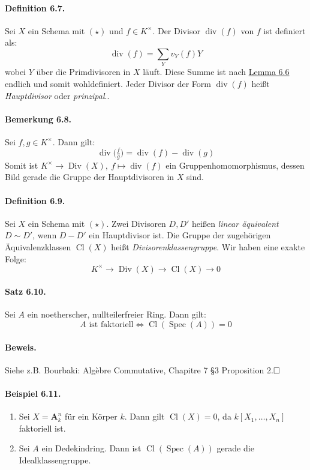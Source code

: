\documentclass[11pt,b5paper,openany]{memoir}
\def \qed {$\hfill\square$}
\begin{document}
\paragraph{Definition 6.7.}\label{6.7} Sei $X$ ein Schema mit $(\star)$ und $f\in K^\times$. Der Divisor $\operatorname{div}(f)$ von $f$ ist definiert als:
\[\operatorname{div}(f)=\sum_Y v_Y(f)Y \]
wobei $Y$ über die Primdivisoren in $X$ läuft. Diese Summe ist nach \hyperref[6.6]{Lemma 6.6} endlich und somit wohldefiniert. Jeder Divisor der Form $\operatorname{div}(f)$ heißt \textit{Hauptdivisor} oder \textit{prinzipal}..

\paragraph{Bemerkung 6.8.}\label{6.8} Sei $f,g\in K^\times$. Dann gilt:
\[\operatorname{div}\big(\tfrac{f}{g}\big)=\operatorname{div}(f)-\operatorname{div}(g) \]
Somit ist $K^\times\to\operatorname{Div}(X),\ f\mapsto\operatorname{div}(f)$ ein Gruppenhomomorphismus, dessen Bild gerade die Gruppe der Hauptdivisoren in $X$ sind.

\paragraph{Definition 6.9.}\label{6.9} Sei $X$ ein Schema mit $(\star)$. Zwei Divisoren $D,D'$ heißen \textit{linear äquivalent} $D\sim D'$, wenn $D-D'$ ein Hauptdivisor ist. Die Gruppe der zugehörigen Äquivalenzklassen $\operatorname{Cl}(X)$ heißt \textit{Divisorenklassengruppe}. Wir haben eine exakte Folge:
\[K^\times\to\operatorname{Div}(X)\to\operatorname{Cl}(X)\to 0 \]

\paragraph{Satz 6.10.}\label{6.10} Sei $A$ ein noetherscher, nullteilerfreier Ring. Dann gilt:
\[A\text{ ist faktoriell}\iff\operatorname{Cl}(\operatorname{Spec}(A))=0 \]

\paragraph{Beweis.} Siehe z.B. Bourbaki: Algèbre Commutative, Chapitre 7 §3 Proposition 2.\qed

\paragraph{Beispiel 6.11.}\label{6.11} \begin{enumerate}
\item Sei $X=\mathbf{A}_k^n$ für ein Körper $k$. Dann gilt $\operatorname{Cl}(X)=0$, da $k[X_1,\ldots,X_n]$ faktoriell ist.
\item Sei $A$ ein Dedekindring. Dann ist $\operatorname{Cl}(\operatorname{Spec}(A))$ gerade die Idealklassengruppe.
\end{enumerate}
\end{document}
